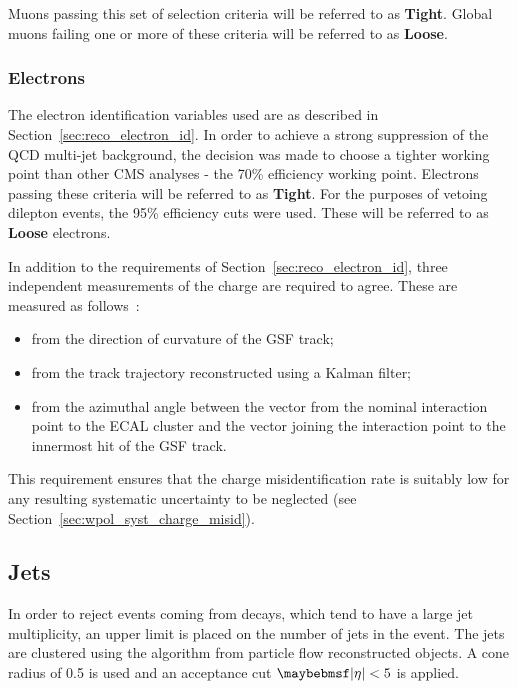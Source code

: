 Muons passing this set of selection criteria will be referred to as
\textbf{Tight}. Global muons failing one or more of these criteria will be
referred to as \textbf{Loose}.

\subsubsection{Electrons}
\label{sec:wpol_electronid}
The electron identification variables used are as described in
Section~\ref{sec:reco_electron_id}. In order to achieve a strong suppression of
the \ac{QCD} multi-jet background, the decision was made to choose a tighter
working point than other \ac{CMS} analyses - the 70\% efficiency working
point. Electrons passing these criteria will be referred to as
\textbf{Tight}. For the purposes of vetoing dilepton events, the 95\% efficiency
cuts were used. These will be referred to as \textbf{Loose} electrons.

In addition to the requirements of Section~\ref{sec:reco_electron_id}, three independent
measurements of the charge are required to agree. These are measured as follows~\cite{wcharge_asymm2}:
\begin{itemize}
\item from the direction of curvature of the \ac{GSF} track;
\item from the track trajectory reconstructed using a Kalman filter;
\item from the azimuthal angle between the vector from the nominal interaction
  point to the \ac{ECAL} cluster and the vector joining the interaction point to
  the innermost hit of the \ac{GSF} track.
\end{itemize}
This requirement ensures that the charge misidentification rate is suitably low
for any resulting systematic uncertainty to be neglected (see
Section~\ref{sec:wpol_syst_charge_misid}).

\subsection{Jets}
\label{sec:wpol_jets}
In order to reject events coming from \ttbar decays, which tend to have a large
jet multiplicity, an upper limit is placed on the number of jets in the
event. The jets are clustered using the \antikT algorithm from particle flow
reconstructed objects. A cone radius of 0.5 is used and an acceptance cut
$\modeta < 5$ is applied.

